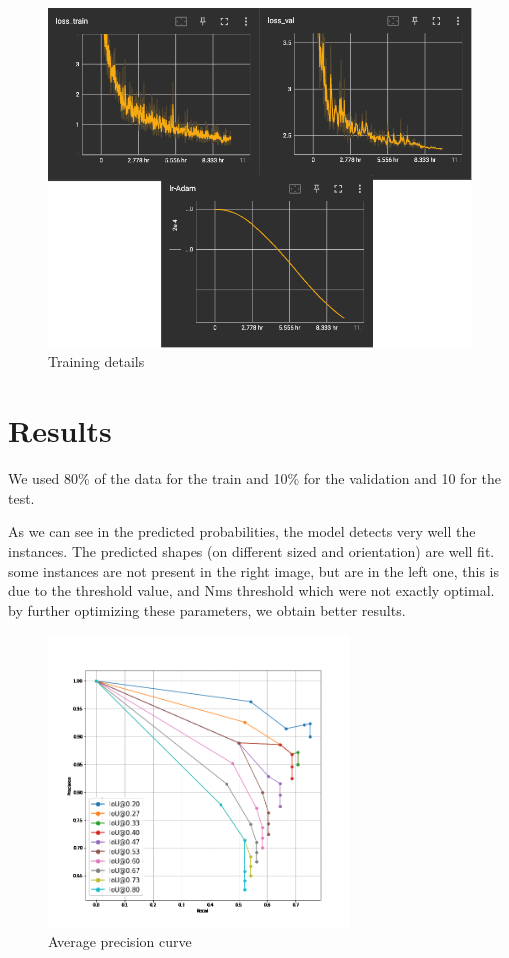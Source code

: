 \documentclass[main.tex]{subfiles}
\begin{document}
\begin{figure}[H]
    \centering
    \includegraphics[width=15cm]{presentationImages/Loss.png}
    \caption{Training details}
\end{figure}

\section{Results}
We used 80\% of the data for the train and 10\% for the validation and 10 for the test.

As we can see in the predicted probabilities, the model detects very well the instances. The predicted shapes (on different sized and orientation) are well fit. some instances are not present in the right image, but are in the left one, this is due to the threshold value, and Nms threshold which were not exactly optimal. by further optimizing these parameters, we obtain better results.

\begin{figure}[H]
    \centering
    \includegraphics[width=8cm]{presentationImages/averageprecision.png}
    \caption{Average precision curve}
\end{figure}
\end{document}

